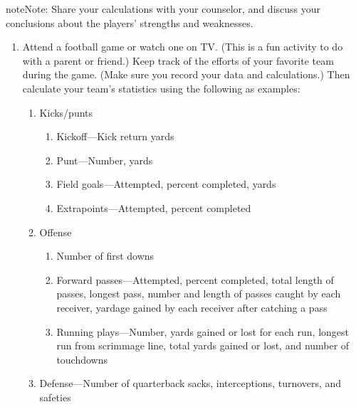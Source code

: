 \documentclass[letterpaper,10pt,english,openany,oneside]{sphinxmanual}
\begin{document}
\begin{sphinxadmonition}{note}{Note:}
Share your calculations with your counselor, and discuss your conclusions about the players’ strengths and weaknesses.
\end{sphinxadmonition}
\begin{enumerate}
%
\setcounter{enumi}{3}
\item {} 
Attend a football game or watch one on TV. (This is a fun activity to do with a parent or friend.) Keep track of the efforts of your favorite team during the game. (Make sure you record your data and calculations.) Then calculate your team’s statistics using the following as examples:
\begin{enumerate}
%
\item {} 
Kicks/punts
\begin{enumerate}
%
\item {} 
Kickoff—Kick return yards

\item {} 
Punt—Number, yards

\item {} 
Field goals—Attempted, percent completed, yards

\item {} 
Extrapoints—Attempted, percent completed

\end{enumerate}

\item {} 
Offense
\begin{enumerate}
%
\item {} 
Number of first downs

\item {} 
Forward passes—Attempted, percent completed, total length of passes, longest pass, number and length of passes caught by each receiver, yardage gained by each receiver after catching a pass

\item {} 
Running plays—Number, yards gained or lost for each run, longest run from scrimmage line, total yards gained or lost, and number of touchdowns

\end{enumerate}

\item {} 
Defense—Number of quarterback sacks, interceptions, turnovers, and safeties

\end{enumerate}

\end{enumerate}
\end{document}
